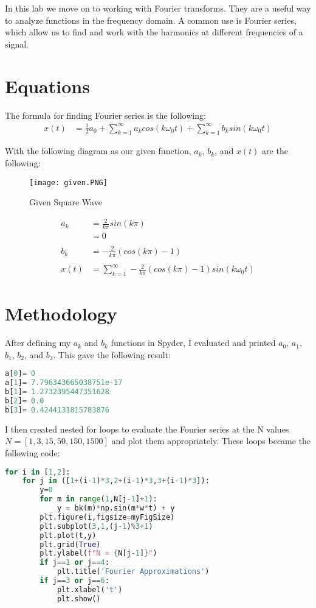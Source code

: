 \documentclass[12pt]{report}
\begin{document}
In this lab we move on to working with Fourier transforms. They are a useful way to analyze functions in the frequency domain. A common use is Fourier series, which allow us to find and work with the harmonics at different frequencies of a signal.

\section{Equations}

The formula for finding Fourier series is the following:
\begin{align*}
     x(t) &= \frac{1}{2}a_{0} + \sum_{k=1}^{\infty} a_k cos(k\omega_{0} t) + \sum_{k=1}^{\infty} b_k sin(k\omega_{0}t)
\end{align*}

With the following diagram as our given function, $a_k$, $b_k$, and $x(t)$ are the following:
\begin{figure}[H]
    \centering
    \texttt{[image: given.PNG]}
    \caption{Given Square Wave}
\end{figure}
\begin{align*}
    a_k &= \frac{2}{k\pi} sin(k\pi) \\
    &= 0 \\
    \\
    b_k &= -\frac{2}{k\pi} (cos(k\pi)-1) \\
    \\
    x(t) &= \sum_{k=1}^{\infty} -\frac{2}{k\pi} (cos(k\pi)-1)sin(k\omega_{0}t)
\end{align*}

 \section{Methodology}
 
After defining my $a_k$ and $b_k$ functions in Spyder, I evaluated and printed $a_0$, $a_1$, $b_1$, $b_2$, and $b_3$. This gave the following result:

\begin{lstlisting}[language=Python]
a[0]= 0
a[1]= 7.796343665038751e-17
b[1]= 1.2732395447351628
b[2]= 0.0
b[3]= 0.4244131815783876
\end{lstlisting}

I then created nested for loops to evaluate the Fourier series at the N values $N=[1,3,15,50,150,1500]$ and plot them appropriately. These loops became the following code:

\begin{lstlisting}[language=Python]
for i in [1,2]:
    for j in ([1+(i-1)*3,2+(i-1)*3,3+(i-1)*3]):
        y=0
        for m in range(1,N[j-1]+1):
            y = bk(m)*np.sin(m*w*t) + y
        plt.figure(i,figsize=myFigSize)
        plt.subplot(3,1,(j-1)%3+1)
        plt.plot(t,y)
        plt.grid(True)
        plt.ylabel(f"N = {N[j-1]}")
        if j==1 or j==4:
            plt.title('Fourier Approximations')
        if j==3 or j==6:
            plt.xlabel('t')
            plt.show()
\end{lstlisting}
\end{document}
